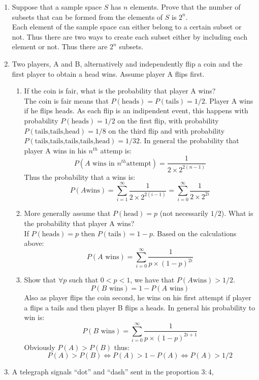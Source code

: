 \documentclass[a4paper]{article}
\begin{document}
\begin{enumerate}
  \item Suppose that a sample space $S$ has $n$ elements. Prove that the number
  of subsets that can be formed from the elements of $S$ is $2^n$. \\
  Each element of the sample space can either belong to a certain subset or not.
  Thus there are two ways to create each subset either by including each element
  or not. Thus there are $2^n$ subsets.
  \item Two players, A and B, alternatively and independently flip a coin and
  the first player to obtain a head wins. Assume player A flips first.
    \begin{enumerate}
      \item If the coin is fair, what is the probability that player A wins?\\
      The coin is fair means that $P(\text{heads})=P(\text{tails})=1/2$. Player
      A wins if he flips heads. As each flip is an indipendent event, this
      happens with probability $P(\text{heads})=1/2$ on the first flip, with
      probability $P(\text{tails,tails,head})=1/8$ on the third flip and with
      probability $P(\text{tails,tails,tails,tails,head})=1/32$. In general the
      probability that player A wins in his $n^{th}$ attemp is:
      $$P(A\text{ wins in } n^{th} \text{
      attempt})=\frac{1}{2\times2^{2(n-1)}}$$
      Thus the probability that a wins is:
      $$P(A \text{
      wins})=\sum_{i=1}^{\infty}\frac{1}{2\times2^{2(i-1)}}=\sum_{i=0}^{\infty}\frac{1}{2\times2^{2i}}$$
      \item More generally assume that $P(\text{head})=p$ (not necessarily
      $1/2$). What is the probability that player A wins?\\
      If $P(\text{heads})=p$ then $P(\text{tails})=1-p$. Based on the
      calculations above:
      $$P(A \text{ wins})=\sum_{i=0}^{\infty}\frac{1}{p\times(1-p)^{2i}}$$
      \item Show that $\forall p$ such that $0<p<1$, we have that $P(A\text{
      wins})>1/2$.\\
      $$P(B \text{ wins})=1-P(A \text{ wins})$$
      Also as player flips the coin second, he wins on his first attempt if
      player a flips a tails and then player B flips a heads. In general his
      probability to win is:
      $$P(B \text{ wins})=\sum_{i=0}^{\infty}\frac{1}{p\times(1-p)^{2i+1}}$$
      Obviously $P(A)>P(B)$ thus:
      $$P(A)>P(B) \Leftrightarrow P(A)>1-P(A) \Leftrightarrow P(A)>1/2$$
    \end{enumerate}
  \item A telegraph signals ``dot'' and ``dash'' sent in the proportion $3 : 4$,

\end{enumerate}
\end{document}
